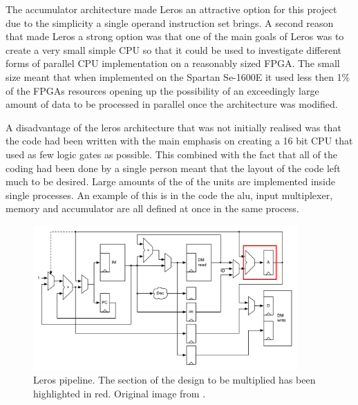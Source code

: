 The accumulator architecture made Leros an attractive option for this project due to 
the simplicity a single operand instruction set brings. A second reason that made Leros a strong option was that one of the main goals of Leros was to create a very small simple CPU so that it could be used to investigate different forms of parallel CPU implementation on a reasonably sized FPGA. The small size meant that when implemented on the Spartan Se-1600E it used less then 1\% of the FPGAs resources opening up the possibility of an exceedingly large amount of data to be processed in parallel once the architecture was modified.

A disadvantage of the leros architecture that was not initially realised was that the code had been written with the main emphasis on creating a 16 bit CPU that used as few logic gates as possible. This combined with the fact that all of the coding had been done by a single person meant that the layout of the code left much to be desired. Large amounts of the of the units are implemented inside single processes. An example of this is in the code the alu, input multiplexer, memory and accumulator are all defined at once in the same process.
 
\begin{figure}[h]
\center
\includegraphics[width=0.9\textwidth]{images/leros-system}
\caption{Leros pipeline. The section of the design to be multiplied has been
highlighted in red. Original image from \cite{schoeberlleros}.
}
\label{fig:leros-system}
\end{figure}
